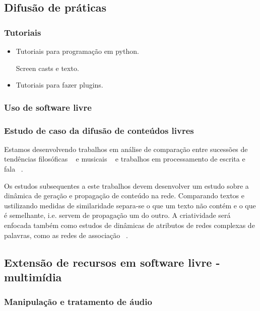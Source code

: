 \subsection{Difusão de práticas}
\label{sec:difusao}

\subsubsection{Tutoriais}
\label{sec:tutoriais}

\begin{itemize}
    \item Tutoriais para programação em python.

Screen casts e texto.

    \item Tutoriais para fazer plugins.
\end{itemize}

\subsubsection{Uso de software livre}
\label{sec:uso_sl}

\subsubsection{Estudo de caso da difusão de conteúdos livres}
\label{sec:dif_sl}

Estamos desenvolvendo trabalhos em análise de comparação
entre sucessões de tendências filosóficas ~\cite{philome} e
musicais ~\cite{musime} e trabalhos em processamento de escrita
e fala ~\cite{rede-associacoes, complenet, enfmc, ifsc}.

Os estudos subsequentes a este trabalhos devem desenvolver
um estudo sobre a dinâmica de geração e propagação de conteúdo na rede.
Comparando textos e ustilizando medidas de similaridade separa-se
o que um texto não contém e o que é semelhante, i.e. servem de propagação
um do outro. A criatividade será enfocada também como estudos de dinâmicas
de atributos de redes complexas de palavras, como as redes de associação ~\cite{rede-associacoes}.


\subsection{Extensão de recursos em software livre - multimídia}
\label{sec:extensao}

\subsubsection{Manipulação e tratamento de áudio}
\label{sec:manip-audio}


